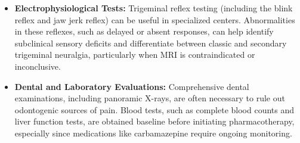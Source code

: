 \begin{itemize}
  \item \textbf{Electrophysiological Tests:} Trigeminal reflex testing (including the blink reflex and jaw jerk reflex) can be useful in specialized centers. Abnormalities in these reflexes, such as delayed or absent responses, can help identify subclinical sensory deficits and differentiate between classic and secondary trigeminal neuralgia, particularly when MRI is contraindicated or inconclusive.
  \item \textbf{Dental and Laboratory Evaluations:} Comprehensive dental examinations, including panoramic X-rays, are often necessary to rule out odontogenic sources of pain. Blood tests, such as complete blood counts and liver function tests, are obtained baseline before initiating pharmacotherapy, especially since medications like carbamazepine require ongoing monitoring.
\end{itemize}

